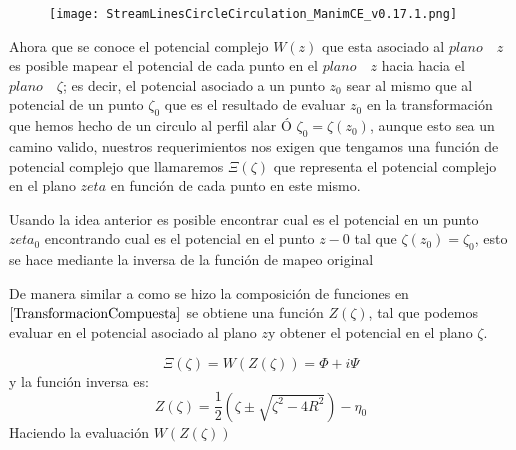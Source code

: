\documentclass[12pt]{article}
\begin{document}
			\begin{figure}[!h]
				\begin{small}
					\begin{center}
						\texttt{[image: StreamLinesCircleCirculation\_ManimCE\_v0.17.1.png]}
					\end{center}
					\caption{}
				\end{small}
			\end{figure}
			

			Ahora que se conoce el potencial complejo $W(z)$ que esta asociado al $plano \quad z$ es posible mapear el potencial de cada punto en el $plano \quad z$ hacia hacia el $plano \quad \zeta$; es decir, el potencial asociado a un punto $z_0$ sear al mismo que al potencial de un punto  $\zeta_0$ que es el resultado de evaluar $z_0$ en la transformación que hemos hecho de un circulo al perfil alar Ó $\zeta_0=\zeta(z_0)$, aunque esto sea un camino valido, nuestros requerimientos nos exigen que tengamos una función de potencial complejo que llamaremos $\Xi(\zeta)$ que representa el potencial complejo en el plano $zeta$ en función de cada punto en este mismo.
			
			Usando la idea anterior es posible encontrar cual es el potencial en un punto $zeta_0$ encontrando cual es el potencial en el punto $z-0$ tal que $\zeta(z_0) = \zeta_0$, esto se hace mediante la inversa de la función de mapeo original
			
			
			De manera similar a como se hizo la composición de funciones en $\ref*{TransformacionCompuesta}$ se obtiene una función $Z(\zeta)$, tal que podemos evaluar en el potencial asociado al plano $z$y obtener el potencial en el plano $\zeta$.

			\begin{equation}
				\Xi(\zeta)= W(Z(\zeta))	= \Phi +i \Psi 			
			\end{equation}
			y la función inversa es:
			\begin{equation}
				Z(\zeta)= \frac{1}{2}\left(\zeta \pm  \sqrt{\zeta^2 -4R^2} \right) - \eta_0
			\end{equation}
			Haciendo la evaluación $W(Z(\zeta))$
			
\end{document}
